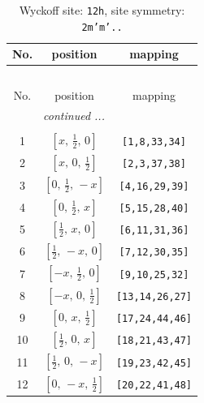 \documentclass[fleqn,8pt]{jsarticle}
\begin{document}
\begin{longtable}{ccc}
\caption{Wyckoff site: {\tt 12h}, site symmetry: {\tt 2m'm'..}}
 \\
 \hline \hline
No. & position & mapping \\ \hline \endfirsthead

\multicolumn{2}{l}{\tablename\ \thetable{}} \\
 \hline \hline
No. & position & mapping \\ \hline \endhead

 \hline \hline
\multicolumn{2}{r}{\footnotesize\it continued ...} \\ \endfoot

 \hline \hline
\multicolumn{2}{r}{} \\ \endlastfoot

1 & $\left[ x,\, \frac{1}{2},\, 0 \right]$ & {\tt [1,8,33,34]} \\ \hline
2 & $\left[ x,\, 0,\, \frac{1}{2} \right]$ & {\tt [2,3,37,38]} \\ \hline
3 & $\left[ 0,\, \frac{1}{2},\, - x \right]$ & {\tt [4,16,29,39]} \\ \hline
4 & $\left[ 0,\, \frac{1}{2},\, x \right]$ & {\tt [5,15,28,40]} \\ \hline
5 & $\left[ \frac{1}{2},\, x,\, 0 \right]$ & {\tt [6,11,31,36]} \\ \hline
6 & $\left[ \frac{1}{2},\, - x,\, 0 \right]$ & {\tt [7,12,30,35]} \\ \hline
7 & $\left[ - x,\, \frac{1}{2},\, 0 \right]$ & {\tt [9,10,25,32]} \\ \hline
8 & $\left[ - x,\, 0,\, \frac{1}{2} \right]$ & {\tt [13,14,26,27]} \\ \hline
9 & $\left[ 0,\, x,\, \frac{1}{2} \right]$ & {\tt [17,24,44,46]} \\ \hline
10 & $\left[ \frac{1}{2},\, 0,\, x \right]$ & {\tt [18,21,43,47]} \\ \hline
11 & $\left[ \frac{1}{2},\, 0,\, - x \right]$ & {\tt [19,23,42,45]} \\ \hline
12 & $\left[ 0,\, - x,\, \frac{1}{2} \right]$ & {\tt [20,22,41,48]} \\
\end{longtable}
\renewcommand{\arraystretch}{1.2}
\end{document}
